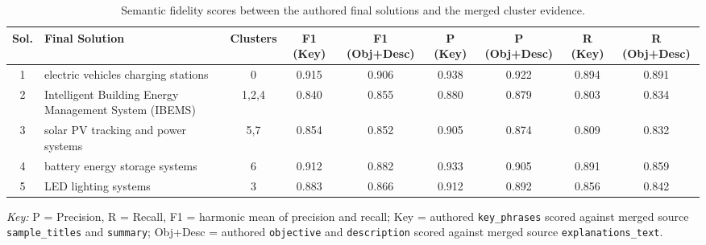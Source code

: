 \begin{table}[h!]
\caption{Semantic fidelity scores between the authored final solutions and the merged cluster evidence.}
\label{tab:cluster_author_semantic_fidelity}
\begin{tabular}{@{} c p{} c c c c c c c @{}}
\toprule
Sol. & Final Solution & Clusters & F1 (Key) & F1 (Obj+Desc) & P (Key) & P (Obj+Desc) & R (Key) & R (Obj+Desc) \\
\midrule
1 & electric vehicles charging stations & 0 & 0.915 & 0.906 & 0.938 & 0.922 & 0.894 & 0.891 \\
2 & Intelligent Building Energy Management System (IBEMS) & 1,2,4 & 0.840 & 0.855 & 0.880 & 0.879 & 0.803 & 0.834 \\
3 & solar PV tracking and power systems & 5,7 & 0.854 & 0.852 & 0.905 & 0.874 & 0.809 & 0.832 \\
4 & battery energy storage systems & 6 & 0.912 & 0.882 & 0.933 & 0.905 & 0.891 & 0.859 \\
5 & LED lighting systems & 3 & 0.883 & 0.866 & 0.912 & 0.892 & 0.856 & 0.842 \\
\bottomrule
\end{tabular}

\vspace{2mm}
\begin{minipage}{\textwidth}
\footnotesize
\textit{Key:} P = Precision, R = Recall, F1 = harmonic mean of precision and recall; Key = authored \texttt{key\_phrases} scored against merged source \texttt{sample\_titles} and \texttt{summary}; Obj+Desc = authored \texttt{objective} and \texttt{description} scored against merged source \texttt{explanations\_text}.
\end{minipage}
\end{table}
